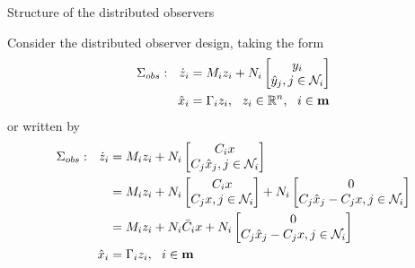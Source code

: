 \documentclass{beamer}
\newcommand{\R}{\mathbb{R}}
\begin{document}
\begin{frame}{\color{blue} Structure of the distributed observers}

Consider the distributed observer design, taking the form
\begin{align*}
\Sigma_{obs}:~~ \dot{z}_{i}&=M_{i}z_{i}+ N_{i}\begin{bmatrix} y_{i} \\ \hat{y}_{j},j\in\mathcal{N}_{i} \\ \end{bmatrix} \\
\hat{x}_{i}&=\Gamma_{i}z_{i},~~ z_{i}\in\R^{n},~~ i\in{\bf m}
\end{align*}
or written by
\begin{align*}
\Sigma_{obs}:~~ \dot{z}_{i}&=M_{i}z_{i}+ N_{i}\begin{bmatrix} C_{i}x \\ C_{j}\hat{x}_{j},j\in\mathcal{N}_{i} \\ \end{bmatrix} \\
&=M_{i}z_{i} + N_{i}\begin{bmatrix} C_{i}x \\ C_{j}x,j\in\mathcal{N}_{i} \\ \end{bmatrix} + N_{i}\begin{bmatrix} 0 \\ C_{j}\hat{x}_{j}-C_{j}x,j\in\mathcal{N}_{i} \\ \end{bmatrix} \\
&=M_{i}z_{i}+ N_{i} \bar{C}_{i} x +N_{i}\begin{bmatrix} 0 \\ C_{j} \hat{x}_{j}-C_{j} x,j\in\mathcal{N}_{i} \\ \end{bmatrix} \\
\hat{x}_{i}&=\Gamma_{i}z_{i},~~ i\in{\bf m}
\end{align*}

\end{frame}
\end{document}
